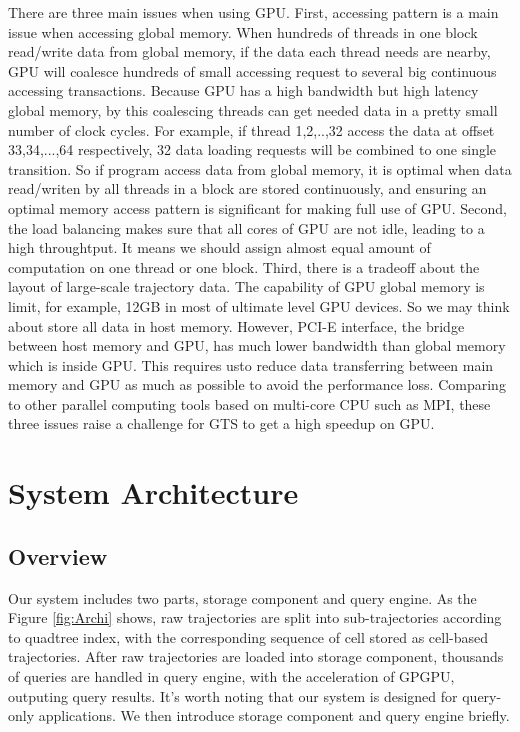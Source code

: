 \documentclass[conference]{IEEEtran}
\begin{document}
There are three main issues when using GPU. First, accessing pattern is a main issue when accessing global memory. When hundreds of threads in one block read/write data from global memory, if the data each thread needs are nearby, GPU will coalesce hundreds of small accessing request to several big continuous accessing transactions. Because GPU has a high bandwidth but high latency global memory, by this coalescing threads can get needed data in a pretty small number of clock cycles. For example, if thread 1,2,..,32 access the data at offset 33,34,...,64 respectively, 32 data loading requests will be combined to one single transition. So if program access data from global memory, it is optimal when data read/writen by all threads in a block are stored continuously, and ensuring an optimal memory access pattern is significant for making full use of GPU. Second, the load balancing makes sure that all cores of GPU are not idle, leading to a high throughtput. It means we should assign almost equal amount of computation on one thread or one block. Third, there is a tradeoff about the layout of large-scale trajectory data. The capability of GPU global memory is limit, for example, 12GB in most of ultimate level GPU devices. So we may think about store all data in host memory. However, PCI-E interface, the bridge between host memory and GPU, has much lower bandwidth than global memory which is inside GPU. This requires usto reduce data transferring between main memory and GPU as much as possible to avoid the performance loss. Comparing to other parallel computing tools based on multi-core CPU such as MPI, these three issues raise a challenge for GTS to get a high speedup on GPU.

\section{System Architecture}

\subsection{Overview}
Our system includes two parts, storage component and query engine. As the Figure \ref{fig:Archi} shows, raw trajectories are split into sub-trajectories according to quadtree index, with the corresponding sequence of cell stored as cell-based trajectories. After raw trajectories are loaded into storage component, thousands of queries are handled in query engine, with the acceleration of GPGPU, outputing query results. It's worth noting that our system is designed for query-only applications. We then introduce storage component and query engine briefly.
\end{document}
